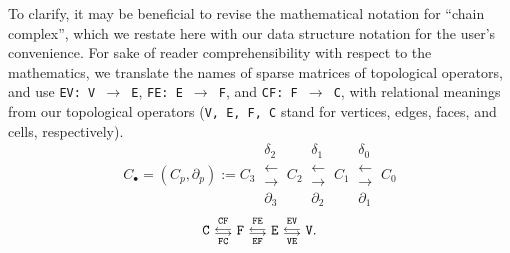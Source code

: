 \documentclass{juliacon}
\begin{document}
To clarify, it may be beneficial to revise the mathematical notation for “chain complex”, which we restate here with our data structure notation for the user’s convenience. For sake of reader comprehensibility with respect to the mathematics, we translate the names of sparse matrices of topological operators, and use {\tt EV: V $\to$ E}, {\tt FE: E $\to$ F}, and {\tt CF: F $\to$ C}, with relational meanings from our topological operators ({\tt V, E, F, C} stand for vertices, edges, faces, and cells, respectively).
\[ 
	C_\bullet = (C_p, \partial_p) := 
	C_3 \ 
	\substack{
		\delta_2 \\
		\longleftarrow \\[-1mm]
		\longrightarrow \\
		\partial_3 
	}
	\ C_2 \ 
	\substack{
		\delta_1 \\
		\longleftarrow \\[-1mm]
		\longrightarrow \\
		\partial_2 
	}
	\ C_1 \ 
	\substack{
		\delta_0 \\
		\longleftarrow \\[-1mm]
		\longrightarrow \\
		\partial_1 
	}
	\ C_0 
	\]
	\[
	{\tt C} \ 
	\substack{
		{\tt CF}\\
		\longleftarrow \\[-1mm]
		\longrightarrow \\
		{\tt FC}
	}
	\ {\tt F} \ 
	\substack{
		{\tt FE}\\
		\longleftarrow \\[-1mm]
		\longrightarrow \\
		{\tt EF}
	}
	\ {\tt E} \ 
	\substack{
		{\tt EV}\\
		\longleftarrow \\[-1mm]
		\longrightarrow \\
		{\tt VE}
	}
	\ {\tt V}.
\]


\end{document}
